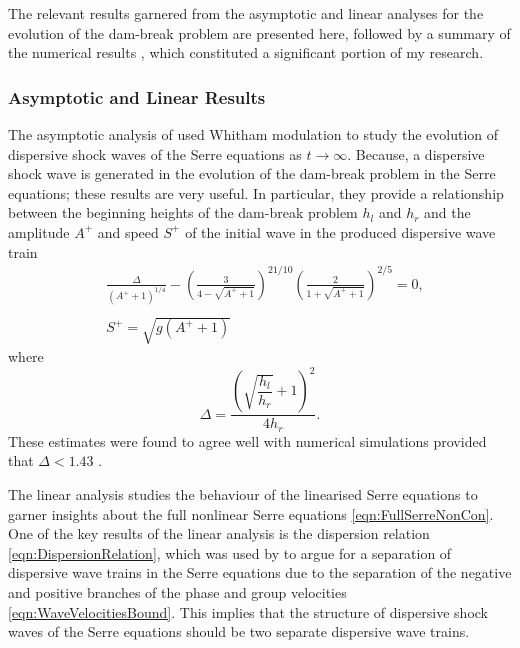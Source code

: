 The relevant results garnered from the asymptotic \cite{El-etal-2006} and linear \cite{Dougalis-etal-2007} analyses for the evolution of the dam-break problem are presented here, followed by a summary of the numerical results \cite{Pitt-2018-61}, which constituted a significant portion of my research. 

\subsubsection{Asymptotic and Linear Results}
The asymptotic analysis of \citet{El-etal-2006} used Whitham modulation to study the evolution of dispersive shock waves of the Serre equations as $t\rightarrow \infty$. Because, a dispersive shock wave is generated in the evolution of the dam-break problem in the Serre equations; these results are very useful. In particular, they provide a relationship between the beginning heights of the dam-break problem $h_l$ and $h_r$ and the amplitude $A^+$ and speed $S^+$ of the initial wave in the produced dispersive wave train 
\begin{subequations}
	\begin{align}
	&\frac{\Delta}{\left(A^+ + 1\right)^{1/4}} - \left(\frac{3}{4 -  \sqrt{A^+ + 1}}\right)^{21/10} \left(\frac{2}{1 + \sqrt{A^+ + 1}}\right)^{2/5} = 0,	\label{eqn:Aplusdef} \\  \nonumber \\
	&S^+ = \sqrt{g \left(A^+ + 1\right)}	\label{eqn:Splusdef}
	\end{align}
	\label{eqn:ELWhitMod}	
\end{subequations}
where
\begin{equation}
\Delta = \frac{\left(\sqrt{\dfrac{h_l}{h_r}} + 1\right)^2}{4 h_r}.
\end{equation}
These estimates were found to agree well with numerical simulations provided that $\Delta < 1.43$ \cite{El-etal-2006}.

The linear analysis studies the behaviour of the linearised Serre equations to garner insights about the full nonlinear Serre equations \eqref{eqn:FullSerreNonCon}. One of the key results of the linear analysis is the dispersion relation \eqref{eqn:DispersionRelation}, which was used by \citet{Dougalis-etal-2007} to argue for a separation of dispersive wave trains in the Serre equations due to the separation of the negative and positive branches of the phase and group velocities \eqref{eqn:WaveVelocitiesBound}. This implies that the structure of dispersive shock waves of the Serre equations should be two separate dispersive wave trains.


